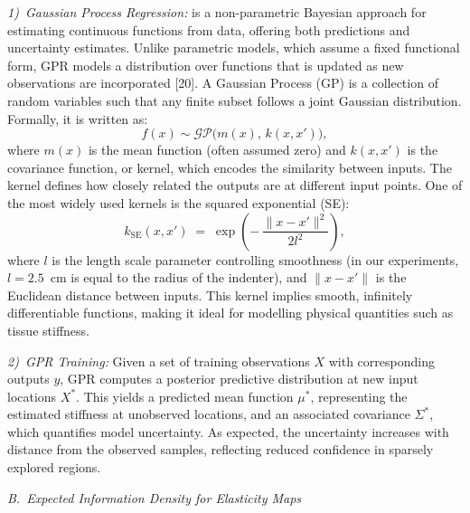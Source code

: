 \documentclass[11pt]{article}
\begin{document}
\vspace{0.3em}

\noindent\textit{\hspace{1em}1)~Gaussian Process Regression:} is a
non-parametric Bayesian approach for estimating continuous functions
from data, offering both predictions and uncertainty estimates. Unlike
parametric models, which assume a fixed functional form, GPR models a
distribution over functions that is updated as new observations are
incorporated [20]. A Gaussian Process (GP) is a collection of random
variables such that any finite subset follows a joint Gaussian
distribution. Formally, it is written as:
\[
   f(x) \sim \mathcal{GP}\bigl(m(x),\, k(x,x')\bigr),
\]
where $m(x)$ is the mean function (often assumed zero) and $k(x,x')$
is the covariance function, or kernel, which encodes the similarity
between inputs. The kernel defines how closely related the outputs
are at different input points. One of the most widely used kernels is
the squared exponential (SE):
\[
   k_{\mathrm{SE}}(x,x') \;=\; \exp\!\left(-\,\frac{\|x - x'\|^{2}}{2l^{2}}\right),
\]
where $l$ is the length scale parameter controlling smoothness (in
our experiments, $l = 2.5$~cm is equal to the radius of the indenter),
and $\|x - x'\|$ is the Euclidean distance between inputs. This kernel
implies smooth, infinitely differentiable functions, making it ideal
for modelling physical quantities such as tissue stiffness.

\vspace{0.3em}

\noindent\textit{\hspace{1em}2)~GPR Training:} Given a set of training
observations $X$ with corresponding outputs $y$, GPR computes a
posterior predictive distribution at new input locations $X^{*}$.
This yields a predicted mean function $\mu^{*}$, representing the
estimated stiffness at unobserved locations, and an associated
covariance $\Sigma^{*}$, which quantifies model uncertainty. As
expected, the uncertainty increases with distance from the observed
samples, reflecting reduced confidence in sparsely explored regions.

\vspace{0.6em}

\noindent\textit{B.~Expected Information Density for Elasticity Maps}

\vspace{0.2em}
\end{document}
